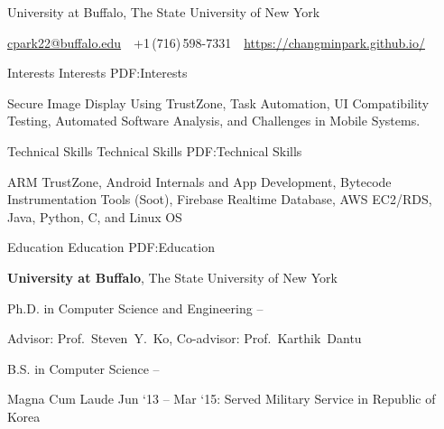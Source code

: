 \documentclass[letterpaper,MMMyyyy,nonstopmode]{simpleresumecv}
\newcommand{\CVAuthor}{Chang Min Park}
\newcommand{\CVWebpage}{https://changminpark.github.io/}
\begin{document}

\Title{\CVAuthor}

\begin{SubTitle}
University at Buffalo, The State University of New York
\par
\href{mailto:cpark22@buffalo.edu}
{cpark22@buffalo.edu}
\,\SubBulletSymbol\,
+1\,(716)\,598-7331
\,\SubBulletSymbol\,
\href{\CVWebpage}
{\url{\CVWebpage}}
\end{SubTitle}

\begin{Body}

\vspace{-0.5ex}
\Section
{Interests}
{Interests}
{PDF:Interests}

\Entry
Secure Image Display Using TrustZone, Task Automation, UI Compatibility Testing, 
Automated Software Analysis, and Challenges in Mobile Systems.

\vspace{-0.5ex}
\Section
{Technical Skills}
{Technical Skills}
{PDF:Technical Skills}

\Entry
ARM TrustZone, Android Internals and App Development, Bytecode Instrumentation Tools (Soot),
Firebase Realtime Database, AWS EC2/RDS, Java, Python, C, and Linux OS

\vspace{-0.5ex}
\Section
{Education}
{Education}
{PDF:Education}

\Entry
\textbf{University at Buffalo}, The State University of New York

\Gap
\BulletItem
Ph.D. in Computer Science and Engineering
\hfill
{} --
\begin{Detail}
\SubBulletItem
Advisor:
Prof.~Steven~Y.~Ko, 
Co-advisor:
Prof.~Karthik~Dantu
\end{Detail}

\Gap
\BulletItem
B.S. in Computer Science
\hfill
{} --
\begin{Detail}
\SubBulletItem
Magna Cum Laude
\SubBulletItem
Jun `13 -- Mar `15: Served Military Service in Republic of Korea
\end{Detail}




\end{Body}
\end{document}
